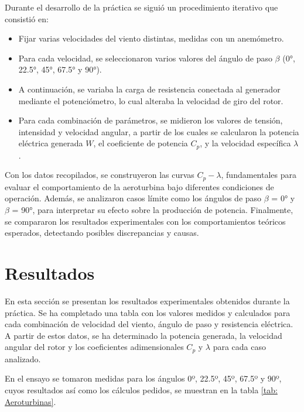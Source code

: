 \documentclass[10pt]{IEEEtran}
\begin{document}
Durante el desarrollo de la práctica se siguió un procedimiento iterativo que consistió en:
\begin{itemize}
  \item Fijar varias velocidades del viento distintas, medidas con un anemómetro.
  \item Para cada velocidad, se seleccionaron varios valores del ángulo de paso $\beta$ (0°, 22.5°, 45°, 67.5° y 90°).
  \item A continuación, se variaba la carga de resistencia conectada al generador mediante el potenciómetro, lo cual alteraba la velocidad de giro del rotor.
  \item Para cada combinación de parámetros, se midieron los valores de tensión, intensidad y velocidad angular, a partir de los cuales se calcularon la potencia eléctrica generada $W$, el coeficiente de potencia $C_p$, y la velocidad específica $\lambda$.
\end{itemize}

Con los datos recopilados, se construyeron las curvas $C_p - \lambda$, fundamentales para evaluar el comportamiento de la aeroturbina bajo diferentes condiciones de operación. Además, se analizaron casos límite como los ángulos de paso $\beta$ = 0° y $\beta$ = 90°, para interpretar su efecto sobre la producción de potencia. Finalmente, se compararon los resultados experimentales con los comportamientos teóricos esperados, detectando posibles discrepancias y causas.

\section{Resultados}
En esta sección se presentan los resultados experimentales obtenidos durante la práctica. Se ha completado una tabla con los valores medidos y calculados para cada combinación de velocidad del viento, ángulo de paso y resistencia eléctrica. A partir de estos datos, se ha determinado la potencia generada, la velocidad angular del rotor y los coeficientes adimensionales $C_p$ y $\lambda$ para cada caso analizado.

En el ensayo se tomaron medidas para los ángulos 0º, 22.5º, 45º, 67.5º y 90º, cuyos resultados así como los cálculos pedidos, se muestran en la tabla \ref{tab: Aeroturbinas}.
\end{document}
